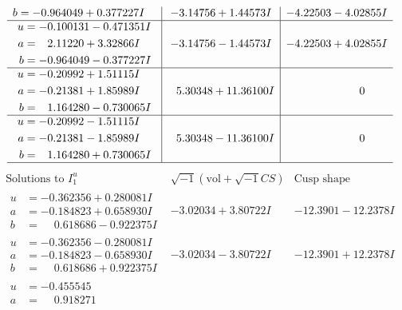 \documentclass[1p]{elsarticle_modified}
\theoremstyle{definition}
\newcommand{\I}{\sqrt{-1}}
\begin{document}
$$\begin{array}{c|c|c}
\begin{aligned}
b &= -0.964049 + 0.377227 I\end{aligned}
 & -3.14756 + 1.44573 I & -4.22503 - 4.02855 I \\ \hline\begin{aligned}
u &= -0.100131 - 0.471351 I \\
a &= \phantom{-}2.11220 + 3.32866 I \\
b &= -0.964049 - 0.377227 I\end{aligned}
 & -3.14756 - 1.44573 I & -4.22503 + 4.02855 I \\ \hline\begin{aligned}
u &= -0.20992 + 1.51115 I \\
a &= -0.21381 + 1.85989 I \\
b &= \phantom{-}1.164280 - 0.730065 I\end{aligned}
 & \phantom{-}5.30348 + 11.36100 I & \phantom{-0.000000 } 0 \\ \hline\begin{aligned}
u &= -0.20992 - 1.51115 I \\
a &= -0.21381 - 1.85989 I \\
b &= \phantom{-}1.164280 + 0.730065 I\end{aligned}
 & \phantom{-}5.30348 - 11.36100 I & \phantom{-0.000000 } 0\\
 \hline 
 \end{array}$$\newpage$$\begin{array}{c|c|c}  
\text{Solutions to }I^u_{1}& \I (\text{vol} + \sqrt{-1}CS) & \text{Cusp shape}\\
 \hline 
\begin{aligned}
u &= -0.362356 + 0.280081 I \\
a &= -0.184823 + 0.658930 I \\
b &= \phantom{-}0.618686 - 0.922375 I\end{aligned}
 & -3.02034 + 3.80722 I & -12.3901 - 12.2378 I \\ \hline\begin{aligned}
u &= -0.362356 - 0.280081 I \\
a &= -0.184823 - 0.658930 I \\
b &= \phantom{-}0.618686 + 0.922375 I\end{aligned}
 & -3.02034 - 3.80722 I & -12.3901 + 12.2378 I \\ \hline\begin{aligned}
u &= -0.455545\phantom{ +0.000000I} \\
a &= \phantom{-}0.918271\phantom{ +0.000000I} \\

\end{aligned}
\end{array}$$
\end{document}
